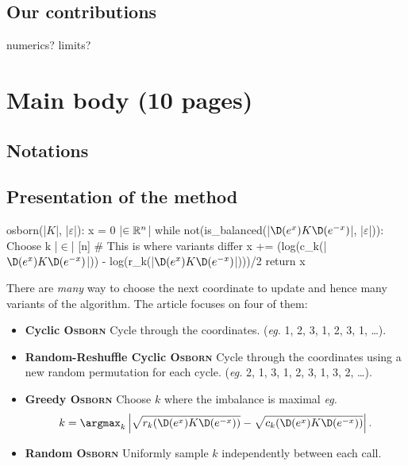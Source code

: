 \subsection{Our contributions}

numerics?
limits? 

\section{Main body (10 pages)}

\subsection{Notations}

\subsection{Presentation of the method}


\begin{code}
osborn(|\(K\)|, |\(\varepsilon\)|):
    x = 0 |\(\in \mathbb{R}^n\)|
    while not(is_balanced(|\(\D(e^x) K \D(e^{-x})\)|, |\(\varepsilon\)|)):
        Choose k |\(\in\)| [n] # This is where variants differ
        x += (log(c_k(|\(\D(e^x) K \D(e^{-x})\)|)) - log(r_k(|\(\D(e^x) K \D(e^{-x})\)|)))/2
    return x
\end{code}

There are \textit{many} way to choose the next coordinate to update and hence many variants of the algorithm. The article focuses on four of them:
\begin{itemize}
    \item \textbf{Cyclic \textsc{Osborn}} Cycle through the coordinates. (\textit{eg.} {\color{magenta}1, 2, 3}, {\color{cyan}1, 2, 3}, {\color{red}1,} \dots).
    \item \textbf{Random-Reshuffle Cyclic \textsc{Osborn}} Cycle through the coordinates using a new random permutation for each cycle. (\textit{eg.} {\color{magenta}2, 1, 3}, {\color{cyan}1, 2, 3}, {\color{red}1, 3, 2}, \dots).
    \item \textbf{Greedy \textsc{Osborn}} Choose \(k\) where the imbalance is maximal \textit{eg.}
    \[
        k = \argmax_{k}\left|\sqrt{r_k(\D(e^x) K \D(e^{-x}))} - \sqrt{c_k(\D(e^x) K \D(e^{-x}))}\right|.    
    \]
    \item \textbf{Random \textsc{Osborn}} Uniformly sample \(k\) independently between each call.
\end{itemize}

